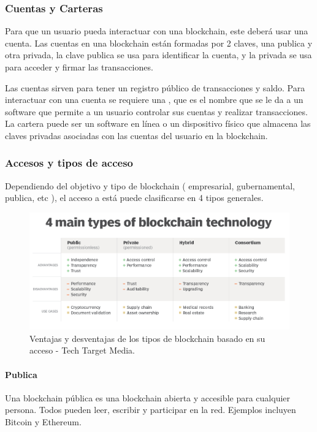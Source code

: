 \subsubsection{Cuentas y Carteras}

Para que un usuario pueda interactuar con una blockchain, este deberá usar una cuenta. Las cuentas en una blockchain están formadas por 2 claves, una publica y otra privada, la clave publica se usa para identificar la cuenta, y la privada se usa para acceder y firmar las transacciones.

\bigskip

Las cuentas sirven para tener un registro público de transacciones y saldo. Para interactuar con una cuenta se requiere una , que es el nombre que se le da a un software que permite a un usuario controlar sus cuentas y realizar transacciones. La cartera puede ser un software en línea o un dispositivo físico que almacena las claves privadas asociadas con las cuentas del usuario en la blockchain.

\bigskip

\newpage

\subsubsection{Accesos y tipos de acceso}
Dependiendo del objetivo y tipo de blockchain ( empresarial, gubernamental, publica, etc ), el acceso a está puede clasificarse en 4 tipos generales.

\begin{figure}[H]
        \centering
        \includegraphics[width=1\textwidth]{img/capturas/types.png}
        \caption{Ventajas y desventajas de los tipos de blockchain basado en su acceso - Tech Target Media.}
        \label{fig:configApi}
\end{figure}

    \paragraph{Publica}
    Una blockchain pública es una blockchain abierta y accesible para cualquier persona. Todos pueden leer, escribir y participar en la red. Ejemplos incluyen Bitcoin y Ethereum.
    
